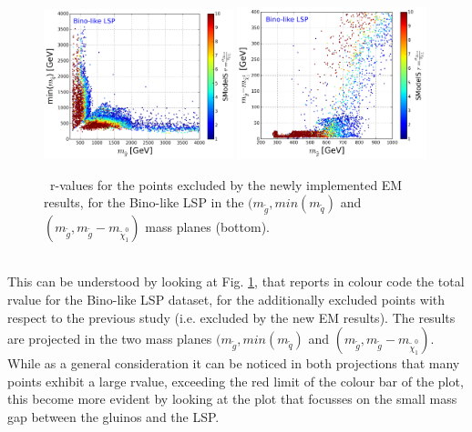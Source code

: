 \documentclass[epj,nopacs,fleqn]{svjour}
\begin{document}
\begin{figure}[b]
\begin{center}
\subfigure
\includegraphics[width=0.49\textwidth]{PLOTS/BINO_rValus_Glu_Sq.png}
\subfigure
{\includegraphics[width=0.49\textwidth]{PLOTS/BINO_rValus_Glu_Diff_Neu.png}}
\end{center}
\caption{\SMO~r-values for the points excluded by the newly implemented EM results, for the Bino-like LSP in the $(m_{\tilde{g}},min(m_{\tilde q})$ and $(m_{\tilde{g}}, m_{\tilde{g}} - m_{\tilde \chi _1 ^0 })$ mass planes (bottom).} 
\label{rValues}
\end{figure}
\\
This can be understood by looking at Fig. \ref{rValues}, that reports in colour code the total \SMO rvalue for the Bino-like LSP dataset, for the additionally excluded points with respect to the previous study (i.e. excluded by the new EM results). The results are projected in the two mass planes $(m_{\tilde{g}},min(m_{\tilde q})$ and $(m_{\tilde{g}}, m_{\tilde{g}} - m_{\tilde \chi _1 ^0 })$. While as a general consideration it can be noticed in both projections that many points exhibit a large rvalue, exceeding the red limit of the colour bar of the plot, this become more evident by looking at the plot that focusses on the small mass gap between the gluinos and the LSP. 
\\
\end{document}
